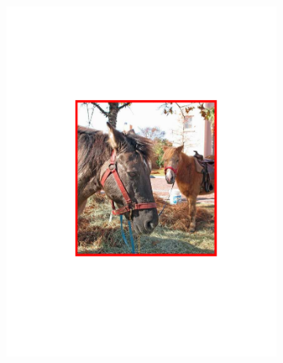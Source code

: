 \begin{figure}[hbt]
    \begin{subfigure}[b]{0.45\textwidth}
        \centering
        \includegraphics[width=\textwidth]{FP3}
        \caption{}
        \label{fig:detfp3}
    \end{subfigure}
    ~
    \begin{subfigure}[b]{0.45\textwidth}
        \centering

\end{subfigure}
\end{figure}
